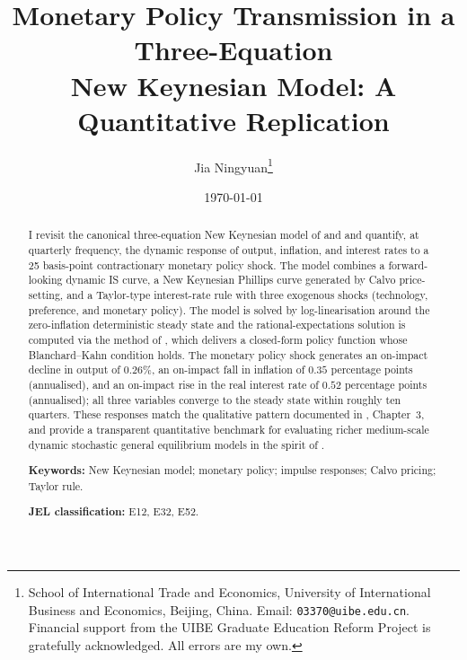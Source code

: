 \documentclass[11pt]{article}
\title{\textbf{Monetary Policy Transmission in a Three-Equation \\
       New Keynesian Model: A Quantitative Replication}}
\author{Jia Ningyuan\thanks{%
  School of International Trade and Economics, University of International
  Business and Economics, Beijing, China. Email: \texttt{03370@uibe.edu.cn}.
  Financial support from the UIBE Graduate Education Reform Project is
  gratefully acknowledged. All errors are my own.}}
\date{\today}
\begin{document}
\maketitle

\begin{abstract}
\noindent
I revisit the canonical three-equation New Keynesian model of
\citet{Gali2008} and \citet{Woodford2003} and quantify, at quarterly
frequency, the dynamic response of output, inflation, and interest rates
to a 25 basis-point contractionary monetary policy shock. The model
combines a forward-looking dynamic IS curve, a New Keynesian Phillips
curve generated by Calvo price-setting, and a Taylor-type interest-rate
rule with three exogenous shocks (technology, preference, and monetary
policy). The model is solved by log-linearisation around the
zero-inflation deterministic steady state and the rational-expectations
solution is computed via the method of \citet{Klein2000}, which delivers
a closed-form policy function whose Blanchard--Kahn condition holds. The
monetary policy shock generates an on-impact decline in output of
$0.26\%$, an on-impact fall in inflation of $0.35$ percentage points
(annualised), and an on-impact rise in the real interest rate of $0.52$
percentage points (annualised); all three variables converge to the
steady state within roughly ten quarters. These responses match the
qualitative pattern documented in \citet{Gali2008}, Chapter~3, and
provide a transparent quantitative benchmark for evaluating richer
medium-scale dynamic stochastic general equilibrium models in the spirit
of \citet{SmetsWouters2007}.
\medskip

\noindent \textbf{Keywords:} New Keynesian model; monetary policy;
impulse responses; Calvo pricing; Taylor rule.

\noindent \textbf{JEL classification:} E12, E32, E52.
\end{abstract}

\clearpage











\appendix


\end{document}
